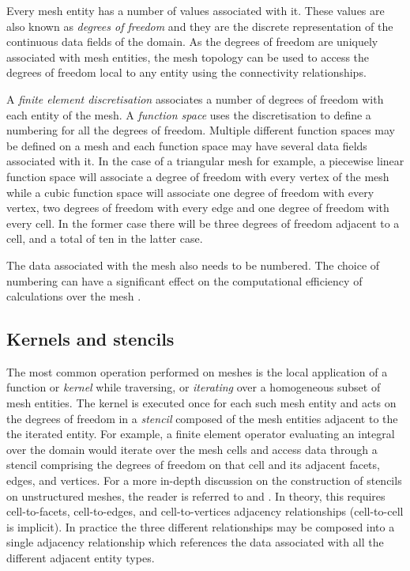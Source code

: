 \documentclass[11pt, a4paper]{scrartcl}
\begin{document}
Every mesh entity has a number of values associated with it. These
values are also known as \emph{degrees of freedom} and they are the
discrete representation of the continuous data fields of the domain.
As the degrees of freedom are uniquely associated with mesh entities,
the mesh topology can be used to access the degrees of freedom local
to any entity using the connectivity relationships.

A \emph{finite element discretisation} associates a number of degrees
of freedom with each entity of the mesh. A \emph{function space} uses
the discretisation to define a numbering for all the degrees of
freedom. Multiple different function spaces may be defined on a mesh
and each function space may have several data fields associated with
it. In the case of a triangular mesh for example, a piecewise linear
function space will associate a degree of freedom with every vertex of
the mesh while a cubic function space will associate one degree of
freedom with every vertex, two degrees of freedom with every edge and
one degree of freedom with every cell. In the former case there will
be three degrees of freedom adjacent to a cell, and a total of ten in
the latter case.

The data associated with the mesh also needs to be numbered.  The
choice of numbering can have a significant effect on the computational
efficiency of calculations over the mesh
\citep{Gunther:2006,Lange:2016,Yoon:2005}.

\subsection{Kernels and stencils}
\label{ssec:kernels-stencils}

The most common operation performed on meshes is the local application
of a function or \emph{kernel} while traversing, or \emph{iterating}
over a homogeneous subset of mesh entities.  The kernel is executed
once for each such mesh entity and acts on the degrees of freedom in a
\emph{stencil} composed of the mesh entities adjacent to the the
iterated entity.  For example, a finite element operator evaluating an
integral over the domain would iterate over the mesh cells and access
data through a stencil comprising the degrees of freedom on that cell
and its adjacent facets, edges, and vertices.  For a more in-depth
discussion on the construction of stencils on unstructured meshes, the
reader is referred to \cite{Logg:2009} and \cite{Knepley:2009}.  In
theory, this requires cell-to-facets, cell-to-edges, and
cell-to-vertices adjacency relationships (cell-to-cell is
implicit). In practice the three different relationships may be
composed into a single adjacency relationship which references the
data associated with all the different adjacent entity types.
\end{document}
